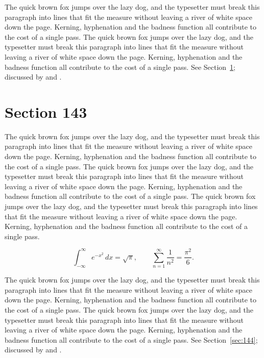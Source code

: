 \documentclass{article}
\begin{document}
The quick brown fox jumps over the lazy dog, and the typesetter must break this paragraph into lines that fit the measure without leaving a river of white space down the page. Kerning, hyphenation and the badness function all contribute to the cost of a single pass. The quick brown fox jumps over the lazy dog, and the typesetter must break this paragraph into lines that fit the measure without leaving a river of white space down the page. Kerning, hyphenation and the badness function all contribute to the cost of a single pass. 
See Section~\ref{sec:143}; discussed by \textcite{k3} and \textcite{l5}.
\section{Section 143}
\label{sec:143}
The quick brown fox jumps over the lazy dog, and the typesetter must break this paragraph into lines that fit the measure without leaving a river of white space down the page. Kerning, hyphenation and the badness function all contribute to the cost of a single pass. The quick brown fox jumps over the lazy dog, and the typesetter must break this paragraph into lines that fit the measure without leaving a river of white space down the page. Kerning, hyphenation and the badness function all contribute to the cost of a single pass. The quick brown fox jumps over the lazy dog, and the typesetter must break this paragraph into lines that fit the measure without leaving a river of white space down the page. Kerning, hyphenation and the badness function all contribute to the cost of a single pass. 

\begin{equation}\label{eq:143}
\int_{-\infty}^{\infty} e^{-x^{2}}\,dx = \sqrt{\pi}, \qquad
\sum_{n=1}^{\infty} \frac{1}{n^{2}} = \frac{\pi^{2}}{6}.
\end{equation}

The quick brown fox jumps over the lazy dog, and the typesetter must break this paragraph into lines that fit the measure without leaving a river of white space down the page. Kerning, hyphenation and the badness function all contribute to the cost of a single pass. The quick brown fox jumps over the lazy dog, and the typesetter must break this paragraph into lines that fit the measure without leaving a river of white space down the page. Kerning, hyphenation and the badness function all contribute to the cost of a single pass. 
See Section~\ref{sec:144}; discussed by \textcite{k4} and \textcite{l1}.
\end{document}
